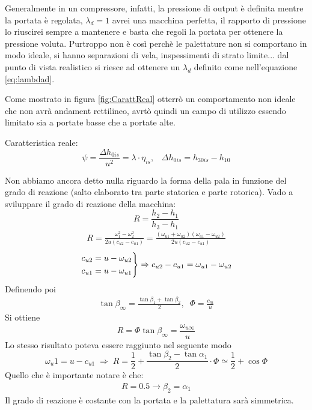 Generalmente in un compressore, infatti, la pressione di output è definita mentre la portata è regolata, $\lambda_d = 1$ avrei una macchina perfetta, il rapporto di pressione lo riuscirei sempre a mantenere e basta che regoli la portata per ottenere la pressione voluta. Purtroppo non è così perchè le palettature non si comportano in modo ideale, si hanno separazioni di vela, inspessimenti di strato limite... dal punto di vista realistico si riesce ad ottenere un $\lambda_d$ definito come nell'equazione \ref{eq:lambdad}. 

Come mostrato in figura \ref{fig:CarattReal} otterrò un comportamento non ideale che non avrà andament rettilineo, avrtò quindi un campo di utilizzo essendo limitato sia a portate basse che a portate alte. 

Caratteristica reale:
\begin{equation}
\psi = \frac{\Delta h_{0is}}{u^2} = \lambda \cdot \eta_{is}, \;\;\; \Delta h_{0is} = h_{30is} - h_{10}
\end{equation}

Non abbiamo ancora detto nulla riguardo la forma della pala in funzione del grado di reazione (salto elaborato tra parte statorica e parte rotorica). Vado a sviluppare il grado di reazione della macchina:
\begin{equation}
R = \frac{h_2 - h_1}{h_3-h_1} 
\end{equation}
\begin{align*}
R = \frac{\omega_1^2 - \omega_2^2}{2 u (c_{u2} - c_{u1})} = \frac{(\omega_{u1} + \omega_{u2})(\omega_{u1}-\omega_{u2})}{2 u (c_{u2} - c_{u1})}
\end{align*}
\begin{align*}
\begin{rcases*}
c_{u2} = u - \omega_{u2}\\
c_{u1} = u - \omega_{u1}
\end{rcases*}
\Rightarrow c_{u2} - c_{u1} = \omega_{u1} - \omega_{u2} 
\end{align*}
Definendo poi
\begin{align*}
\tan \beta_{\infty} = \frac{\tan \beta_1 + \tan \beta_2}{2}, \;\; \Phi = \frac{c_m}{u}
\end{align*}
Si ottiene
\begin{equation}
\boxed{R = \Phi \tan \beta_{\infty} = \frac{\omega_{u \infty}}{u}}
\end{equation}
Lo stesso risultato poteva essere raggiunto nel seguente modo
\begin{equation}
\omega_u1 = u - c_{u1} \; \Rightarrow \; R = \frac{1}{2} + \frac{\tan \beta_2 - \tan \alpha_1}{2} \cdot \Phi \simeq \frac{1}{2} + \cos \Phi
\end{equation}
Quello che è importante notare è che:
\begin{align*}
R = 0.5 \to \beta_2 = \alpha_1
\end{align*}
Il grado di reazione è costante con la portata e la palettatura sarà simmetrica.

